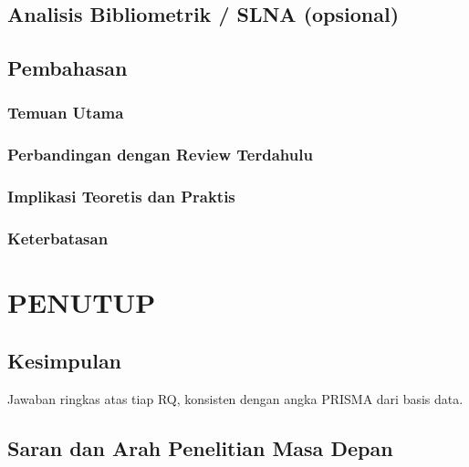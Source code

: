 \documentclass[12pt,a4paper,oneside]{report}
\begin{document}
\section{Analisis Bibliometrik / SLNA (opsional)}

\section{Pembahasan}
\subsection{Temuan Utama}
\subsection{Perbandingan dengan Review Terdahulu}
\subsection{Implikasi Teoretis dan Praktis}
\subsection{Keterbatasan}

\chapter{PENUTUP}\justifying

\section{Kesimpulan}
Jawaban ringkas atas tiap RQ, konsisten dengan angka PRISMA dari basis data.

\section{Saran dan Arah Penelitian Masa Depan}
\end{document}
